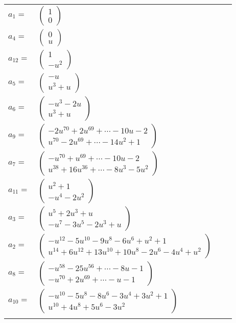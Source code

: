 \documentclass[1p]{elsarticle_modified}
\theoremstyle{definition}
\begin{document}
\begin{tabular}{m{7pt} m{180pt} m{7pt} m{180pt} }
\flushright $a_{1}=$&$\begin{pmatrix}1\\0\end{pmatrix}$ \\
\flushright $a_{4}=$&$\begin{pmatrix}0\\u\end{pmatrix}$ \\
\flushright $a_{12}=$&$\begin{pmatrix}1\\- u^2\end{pmatrix}$ \\
\flushright $a_{5}=$&$\begin{pmatrix}- u\\u^3+u\end{pmatrix}$ \\
\flushright $a_{6}=$&$\begin{pmatrix}- u^3-2 u\\u^3+u\end{pmatrix}$ \\
\flushright $a_{9}=$&$\begin{pmatrix}-2 u^{70}+2 u^{69}+\cdots-10 u-2\\u^{70}-2 u^{69}+\cdots-14 u^2+1\end{pmatrix}$ \\
\flushright $a_{7}=$&$\begin{pmatrix}- u^{70}+u^{69}+\cdots-10 u-2\\u^{38}+16 u^{36}+\cdots-8 u^3-5 u^2\end{pmatrix}$ \\
\flushright $a_{11}=$&$\begin{pmatrix}u^2+1\\- u^4-2 u^2\end{pmatrix}$ \\
\flushright $a_{3}=$&$\begin{pmatrix}u^5+2 u^3+u\\- u^7-3 u^5-2 u^3+u\end{pmatrix}$ \\
\flushright $a_{2}=$&$\begin{pmatrix}- u^{12}-5 u^{10}-9 u^8-6 u^6+u^2+1\\u^{14}+6 u^{12}+13 u^{10}+10 u^8-2 u^6-4 u^4+u^2\end{pmatrix}$ \\
\flushright $a_{8}=$&$\begin{pmatrix}- u^{58}-25 u^{56}+\cdots-8 u-1\\- u^{70}+2 u^{69}+\cdots- u-1\end{pmatrix}$ \\
\flushright $a_{10}=$&$\begin{pmatrix}- u^{10}-5 u^8-8 u^6-3 u^4+3 u^2+1\\u^{10}+4 u^8+5 u^6-3 u^2\end{pmatrix}$\\&\end{tabular}
\end{document}
